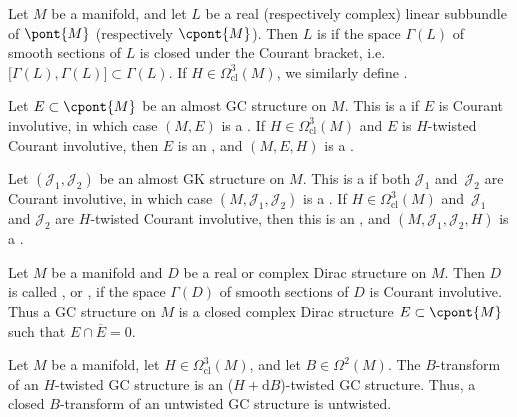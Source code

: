 \begin{Definition}
Let $M$ be a manifold, and let $L$ be a real (respectively complex) linear subbundle of $\pont{M}$ (respectively $\cpont{M}$).  Then $L$ is  if the space $\Gamma(L)$ of smooth sections of $L$ is closed under the Courant bracket, i.e. $\big[ \Gamma(L), \Gamma(L) \big] \subset \Gamma(L)$.  If $H \in \Omega_{\text{cl}}^3(M)$, we similarly def\/ine .

Let $E \subset \cpont{M}$ be an almost GC structure on $M$.  This is a  if $E$ is Courant involutive, in which case $(M,E)$ is a .  If $H \in \Omega_{\text{cl}}^3(M)$ and $E$ is $H$-twisted Courant involutive, then $E$ is an , and $(M,E,H)$ is a .

Let $(\mathcal{J}_1, \mathcal{J}_2)$ be an almost GK structure on $M$.  This is a  if both $\mathcal{J}_1$ and~$\mathcal{J}_2$ are Courant involutive, in which case $(M,\mathcal{J}_1,\mathcal{J}_2)$ is a .  If $H \in \Omega_{\text{cl}}^3(M)$ and~$\mathcal{J}_1$ and $\mathcal{J}_2$ are $H$-twisted Courant involutive, then this is an , and $(M,\mathcal{J}_1,\mathcal{J}_2,H)$ is a .
\end{Definition}


\begin{Remark}
Let $M$ be a manifold and $D$ be a real or complex Dirac structure on $M$.  Then $D$ is called , or , if the space $\Gamma(D)$ of smooth sections of $D$ is Courant involutive.  Thus a GC structure on $M$ is a closed complex Dirac structure $E \subset \cpont{M}$ such that $E \cap \overline{E} = 0$.
\end{Remark}


\begin{Proposition}
Let $M$ be a manifold, let $H \in \Omega_{\text{cl}}^3(M)$, and let $B \in \Omega^2(M)$.  The $B$-transform of an $H$-twisted GC structure is an ($H + \mathrm{d} B$)-twisted GC structure.  Thus, a closed $B$-transform of an untwisted GC structure is untwisted.
\end{Proposition}


